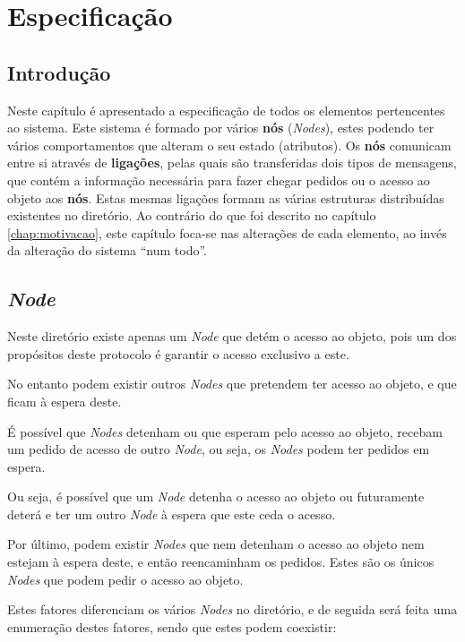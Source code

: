 \chapter{Especificação}
\label{chap:especificacao}

\section{Introdução}
\label{especificacao:sec:intro}
Neste capítulo é apresentado a especificação de todos os elementos pertencentes ao sistema. Este sistema é formado por vários \textbf{nós} (\emph{Nodes}), estes podendo ter vários comportamentos que alteram o seu estado (atributos).
Os \textbf{nós} comunicam entre si através de \textbf{ligações}, pelas quais são transferidas dois tipos de mensagens, que contém a informação necessária para fazer chegar pedidos ou o acesso ao objeto aos \textbf{nós}.
Estas mesmas ligações formam as várias estruturas distribuídas existentes no diretório. 
Ao contrário do que foi descrito no capítulo \ref{chap:motivacao}, este capítulo foca-se nas alterações de cada elemento, ao invés da alteração do sistema ``num todo''.



\section{\emph{Node}}
\label{especificacao:sec:node}

Neste diretório existe apenas um \emph{Node} que detém o acesso ao objeto, pois um dos propósitos deste protocolo é garantir o acesso exclusivo a este. 


No entanto podem existir outros \emph{Nodes} que pretendem ter acesso ao objeto, e que ficam à espera deste. 

É possível que \emph{Nodes} detenham ou que esperam pelo acesso ao objeto, recebam um pedido de acesso de outro \emph{Node}, ou seja, os \emph{Nodes} podem ter pedidos em espera.

Ou seja, é possível que um \emph{Node} detenha o acesso ao objeto ou futuramente deterá e ter um outro \emph{Node} à espera que este ceda o acesso.

Por último, podem existir \emph{Nodes} que nem detenham o acesso ao objeto nem estejam à espera deste, e então reencaminham os pedidos. Estes são os únicos \emph{Nodes} que podem pedir o acesso ao objeto.

Estes fatores diferenciam os vários \emph{Nodes} no diretório,
e de seguida será feita uma enumeração destes fatores, sendo que estes podem coexistir:

